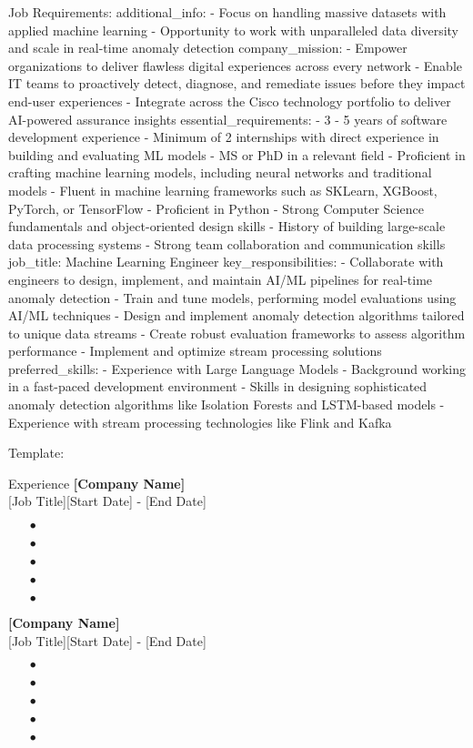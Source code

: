 \documentclass{resume}
\begin{document}
    Job Requirements:
    additional_info:
- Focus on handling massive datasets with applied machine learning
- Opportunity to work with unparalleled data diversity and scale in real-time anomaly
  detection
company_mission:
- Empower organizations to deliver flawless digital experiences across every network
- Enable IT teams to proactively detect, diagnose, and remediate issues before they
  impact end-user experiences
- Integrate across the Cisco technology portfolio to deliver AI-powered assurance
  insights
essential_requirements:
- 3 - 5 years of software development experience
- Minimum of 2 internships with direct experience in building and evaluating ML models
- MS or PhD in a relevant field
- Proficient in crafting machine learning models, including neural networks and traditional
  models
- Fluent in machine learning frameworks such as SKLearn, XGBoost, PyTorch, or TensorFlow
- Proficient in Python
- Strong Computer Science fundamentals and object-oriented design skills
- History of building large-scale data processing systems
- Strong team collaboration and communication skills
job_title: Machine Learning Engineer
key_responsibilities:
- Collaborate with engineers to design, implement, and maintain AI/ML pipelines for
  real-time anomaly detection
- Train and tune models, performing model evaluations using AI/ML techniques
- Design and implement anomaly detection algorithms tailored to unique data streams
- Create robust evaluation frameworks to assess algorithm performance
- Implement and optimize stream processing solutions
preferred_skills:
- Experience with Large Language Models
- Background working in a fast-paced development environment
- Skills in designing sophisticated anomaly detection algorithms like Isolation Forests
  and LSTM-based models
- Experience with stream processing technologies like Flink and Kafka


    Template:
    \begin{rSection}{Experience}
{\bf [Company Name]} \\ 
{[Job Title]}\hfill {[Start Date] - [End Date]}
\begin{itemize}[label=\myfancylabel, leftmargin=0.5cm]
\setlength\itemsep{-0.25cm}
    \item[$\bullet$] 
    \item[$\bullet$] 
    \item[$\bullet$] 
    \item[$\bullet$] 
    \item[$\bullet$] 
\end{itemize}

{\bf [Company Name]} \\ 
{[Job Title]}\hfill {[Start Date] - [End Date]}
\begin{itemize}[label=\myfancylabel, leftmargin=0.5cm]
\setlength\itemsep{-0.25cm}
    \item[$\bullet$] 
    \item[$\bullet$] 
    \item[$\bullet$] 
    \item[$\bullet$] 
    \item[$\bullet$] 
\end{itemize}

\end{rSection}
\end{document}
